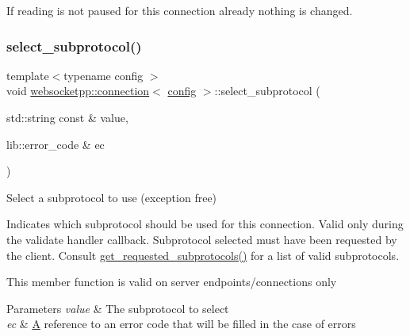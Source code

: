 If reading is not paused for this connection already nothing is changed. \mbox{\label{classwebsocketpp_1_1connection_a53e9587a711e543ed353e8ecec13d44c}} 
\subsubsection{\texorpdfstring{select\+\_\+subprotocol()}{select\_subprotocol()}\hspace{0.1cm}{\footnotesize\ttfamily [1/2]}}
{\footnotesize\ttfamily template$<$typename config $>$ \\
void \mbox{\hyperlink{classwebsocketpp_1_1connection}{websocketpp\+::connection}}$<$ \mbox{\hyperlink{classconfig}{config}} $>$\+::select\+\_\+subprotocol (\begin{DoxyParamCaption}\item[{std\+::string const \&}]{value,  }\item[{lib\+::error\+\_\+code \&}]{ec }\end{DoxyParamCaption})}



Select a subprotocol to use (exception free) 

Indicates which subprotocol should be used for this connection. Valid only during the validate handler callback. Subprotocol selected must have been requested by the client. Consult \mbox{\hyperlink{classwebsocketpp_1_1connection_ae0f196cb11d4a38ef59f2173424a4d51}{get\+\_\+requested\+\_\+subprotocols()}} for a list of valid subprotocols.

This member function is valid on server endpoints/connections only


\begin{DoxyParams}{Parameters}
{\em value} & The subprotocol to select \\
\hline
{\em ec} & \mbox{\hyperlink{struct_a}{A}} reference to an error code that will be filled in the case of errors \\
\hline
\end{DoxyParams}
\mbox{\label{classwebsocketpp_1_1connection_a96b37fbab88dfb78b1641c0c30710243}} 
